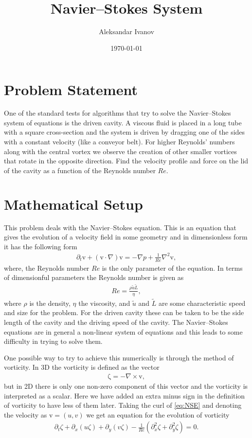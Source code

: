 \documentclass[10pt,a4paper,twocolumn]{article}
\renewcommand{\vec}[1]{\bm{\mathrm{#1}}}
\begin{document}
\title{Navier--Stokes System}
\author{Aleksandar Ivanov}
\date{\today}
\maketitle

\section{Problem Statement}

One of the standard tests for algorithms that try to solve the Navier--Stokes system of equations is the driven cavity. A viscous fluid is placed in a long tube with a square cross-section and the system is driven by dragging one of the sides with a constant velocity (like a conveyor belt). For higher Reynolds' numbers along with the central vortex we observe the creation of other smaller vortices that rotate in the opposite direction. Find the velocity profile and force on the lid of the cavity as a function of the Reynolds number $Re$.

\section{Mathematical Setup}

This problem deals with the Navier--Stokes equation. This is an equation that gives the evolution of a velocity field in some geometry and in dimensionless form it has the following form
%
\begin{align}\label{eq:NSE}
    \partial_t \vec{v} + (\vec{v} \cdot \nabla) \vec{v} = - \nabla p + \frac{1}{Re} \nabla^2 \vec{v},
\end{align}
%
where, the Reynolds number $Re$ is the only parameter of the equation. In terms of dimensionful parameters the Reynolds number is given as
%
\begin{align}
    Re = \frac{\rho \tilde{u} \tilde{L}}{\eta},
\end{align}
%
where $\rho$ is the density, $\eta$ the viscosity, and $\tilde{u}$ and $\tilde{L}$ are some characteristic speed and size for the problem. For the driven cavity these can be taken to be the side length of the cavity and the driving speed of the cavity. The Navier--Stokes equations are in general a non-linear system of equations and this leads to some difficulty in trying to solve them.

One possible way to try to achieve this numerically is through the method of vorticity. In 3D the vorticity is defined as the vector
%
\begin{align}
    \vec{\zeta} = - \nabla \times \vec{v},
\end{align}
%
but in 2D there is only one non-zero component of this vector and the vorticity is interpreted as a scalar. Here we have added an extra minus sign in the definition of vorticity to have less of them later. Taking the curl of \cref{eq:NSE} and denoting the velocity as $\vec{v} = (u, v)$ we get an equation for the evolution of vorticity
%
\begin{align}
    \partial_t \zeta + \partial_x (u \zeta) + \partial_y (v \zeta) - \frac{1}{Re} \left(\partial_x^2 \zeta + \partial_y^2 \zeta\right) = 0.
\end{align}
\end{document}
